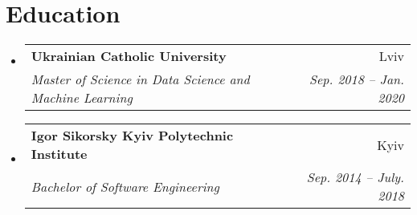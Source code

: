 \documentclass[letterpaper,11pt]{article}
\makeatletter
\newcommand{\resumeSubheading}[4]{
  \vspace{-1pt}\item
    \begin{tabular*}{0.97\textwidth}[t]{l@{\extracolsep{\fill}}r}
      \textbf{#1} & #2 \\
      \textit{\small#3} & \textit{\small #4} \\
    \end{tabular*}\vspace{-5pt}
}
\newcommand{\resumeSubHeadingListStart}{\begin{itemize}[leftmargin=*]}
\newcommand{\resumeSubHeadingListEnd}{\end{itemize}}
\makeatother
\begin{document}
\section{Education}
\resumeSubHeadingListStart
  \resumeSubheading
    {Ukrainian Catholic University}{Lviv}
    {Master of Science in Data Science and Machine Learning}{Sep. 2018 -- Jan. 2020}
  \resumeSubheading
    {Igor Sikorsky Kyiv Polytechnic Institute}{Kyiv}
    {Bachelor of Software Engineering}{Sep. 2014 -- July. 2018}
\resumeSubHeadingListEnd

\end{document}

